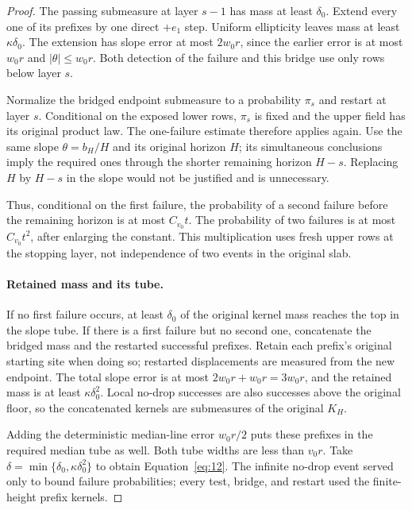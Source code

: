 \begin{proof}
The passing submeasure at layer \(s-1\) has mass at least
\(\delta_0\). Extend every one of its prefixes by one direct
\(+e_1\) step. Uniform ellipticity leaves mass at least
\(\kappa\delta_0\). The extension has slope error at most
\(2w_0r\), since the earlier error is at most \(w_0r\) and
\(|\theta|\le w_0r\). Both detection of the failure and this bridge
use only rows below layer \(s\).

Normalize the bridged endpoint submeasure to a probability \(\pi_s\)
and restart at layer \(s\). Conditional on the exposed lower rows,
\(\pi_s\) is fixed and the upper field has its original product law.
The one-failure estimate therefore applies again. Use the same slope
\(\theta=b_H/H\) and its original horizon \(H\); its simultaneous
conclusions imply the required ones through the shorter remaining
horizon \(H-s\). Replacing \(H\) by \(H-s\) in the slope would
not be justified and is unnecessary.

Thus, conditional on the first failure, the probability of a second
failure before the remaining horizon is at most \(C_{v_0}t\).
The probability of two failures is at most \(C_{v_0}t^2\), after
enlarging the constant. This multiplication uses fresh upper rows at
the stopping layer, not independence of two events in the original slab.

\paragraph{Retained mass and its tube.}
If no first failure occurs, at least \(\delta_0\) of the original
kernel mass reaches the top in the slope tube. If there is a first
failure but no second one, concatenate the bridged mass and the restarted
successful prefixes. Retain each prefix's original starting site when
doing so; restarted displacements are measured from the new endpoint.
The total slope error is at most \(2w_0r+w_0r=3w_0r\), and the
retained mass is at least \(\kappa\delta_0^2\). Local no-drop
successes are also successes above the original floor, so the
concatenated kernels are submeasures of the original \(K_H\).

Adding the deterministic median-line error \(w_0r/2\) puts these
prefixes in the required median tube as well. Both tube widths are
less than \(v_0r\). Take
\(\delta=\min\{\delta_0,\kappa\delta_0^2\}\) to obtain
Equation~\eqref{eq:12}. The infinite no-drop event served only to bound
failure probabilities; every test, bridge, and restart used the
finite-height prefix kernels.
\end{proof}

